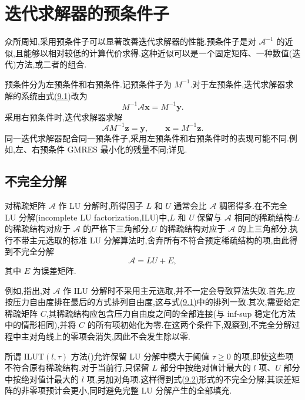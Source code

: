 \section{迭代求解器的预条件子}\label{sec:chapter9-preconditioners}

\begin{note}[预条件子]
\label{note:chapter9-preconditioners}
众所周知,采用预条件子可以显著改善迭代求解器的性能.预条件子是对 $\mathcal A^{-1}$ 的近似,且能够以相对较低的计算代价求得.这种近似可以是一个固定矩阵、一种数值(迭代)方法,或二者的组合.

预条件分为左预条件和右预条件.记预条件子为 $M^{-1}$.对于左预条件,迭代求解器求解的系统由式\hyperref[eq:chapter9-coupled-system]{(9.1)}改为
\[
 M^{-1}\mathcal A\bm x=M^{-1}\bm y.
\]
采用右预条件时,迭代求解器求解
\[
 \mathcal A M^{-1}\bm z=\bm y,
 \qquad \bm x=M^{-1}\bm z.
\]
同一迭代求解器配合同一预条件子,采用左预条件和右预条件时的表现可能不同.例如,左、右预条件 GMRES 最小化的残量不同;详见\textcite[第 9.3.4 节]{Saad2003}.
\end{note}



\subsection{不完全分解}\label{subsec:chapter9-incomplete-factorizations}

\begin{note}[不完全分解]
\label{note:chapter9-incomplete-factorizations}
对稀疏矩阵 $\mathcal A$ 作 LU 分解时,所得因子 $L$ 和 $U$ 通常会比 $\mathcal A$ 稠密得多.在不完全 LU 分解(incomplete LU factorization,ILU)中,$L$ 和 $U$ 保留与 $\mathcal A$ 相同的稀疏结构:$L$ 的稀疏结构对应于 $\mathcal A$ 的严格下三角部分,$U$ 的稀疏结构对应于 $\mathcal A$ 的上三角部分.执行不带主元选取的标准 LU 分解算法时,舍弃所有不符合预定稀疏结构的项,由此得到不完全分解
\begin{equation}\label{eq:chapter9-ilu-incomplete-factorization}
 \mathcal A=LU+E,
\end{equation}
其中 $E$ 为误差矩阵.

例如,\textcite{DahlWille1992}指出,对 $\mathcal A$ 作 ILU 分解时不采用主元选取,并不一定会导致算法失败.首先,应按压力自由度排在最后的方式排列自由度,这与式\hyperref[eq:chapter9-coupled-system]{(9.1)}中的排列一致.其次,需要给定稀疏矩阵 $C$,其稀疏结构应包含压力自由度之间的全部连接(与 inf-sup 稳定化方法中的情形相同),并将 $C$ 的所有项初始化为零.在这两个条件下,\textcite{DahlWille1992}观察到,不完全分解过程中主对角线上的零项会消失,因此不会发生除以零.

所谓 ILUT$(l,\tau)$ 方法(\textcite[第 10.4.1 节]{Saad2003})允许保留 LU 分解中模大于阈值 $\tau\ge0$ 的项,即使这些项不符合原有稀疏结构.对于当前行,只保留 $L$ 部分中按绝对值计最大的 $l$ 项、$U$ 部分中按绝对值计最大的 $l$ 项,另加对角项.这样得到式\hyperref[eq:chapter9-ilu-incomplete-factorization]{(9.2)}形式的不完全分解;其误差矩阵的非零项预计会更小,同时避免完整 LU 分解产生的全部填充.
\end{note}

